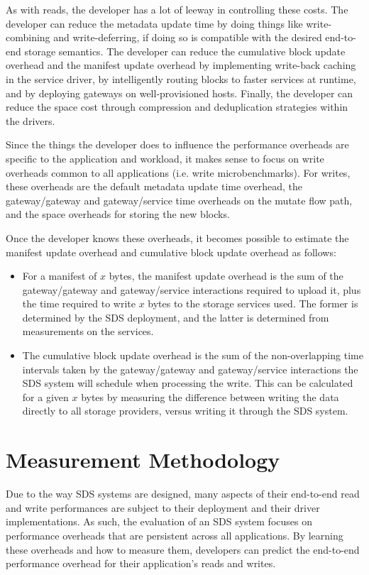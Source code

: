 As with reads, the developer has a lot of leeway in controlling these costs.
The developer can reduce the metadata update time by doing things like
write-combining and write-deferring, if doing so is compatible with the desired
end-to-end storage semantics.  The developer can reduce the cumulative block
update overhead and the manifest update overhead by implementing write-back
caching in the service driver, by
intelligently routing blocks to faster services at runtime, and by deploying
gateways on well-provisioned hosts.  Finally, the
developer can reduce the space cost through compression and deduplication
strategies within the drivers.

Since the things the developer does to influence the performance overheads are specific to the
application and workload, it makes sense to focus on write overheads common to all
applications (i.e. write microbenchmarks).
For writes, these overheads are the default metadata update
time overhead, the gateway/gateway and gateway/service time overheads on the mutate
flow path, and the space overheads for storing the new blocks.

Once the developer knows these overheads, it becomes possible to
estimate the manifest update overhead and cumulative block update overhead as
follows:

\begin{itemize}
\item For a manifest of $x$ bytes, the manifest update overhead is the sum of
the gateway/gateway and gateway/service interactions required to upload it, plus
the time required to write $x$ bytes to the storage services used.  The former
is determined by the SDS deployment, and the latter is determined from
measurements on the services.
\item The cumulative block update overhead is the sum of the non-overlapping
time intervals taken by the gateway/gateway and gateway/service interactions the
SDS system will schedule when processing the write.
This can be calculated for a given $x$ bytes by
measuring the difference between writing the data directly to all storage
providers, versus writing it through the SDS system. 
\end{itemize}

\section{Measurement Methodology}

Due to the way SDS systems are designed, many aspects of their end-to-end read
and write performances are subject to their deployment and their driver
implementations.  As such, the evaluation of an SDS system focuses on
performance overheads that are persistent across all applications.  By learning
these overheads and how to measure them, developers can predict the end-to-end
performance overhead for their application's reads and writes.

